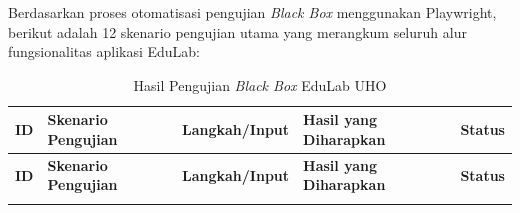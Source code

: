 \documentclass[12pt,a4paper,twoside]{report}
\begin{document}
Berdasarkan proses otomatisasi pengujian \textit{Black Box} menggunakan Playwright, berikut adalah 12 skenario pengujian utama yang merangkum seluruh alur fungsionalitas aplikasi EduLab:

\begin{longtable}{|c|p{3.5cm}|p{4cm}|p{4cm}|c|}
\caption{Hasil Pengujian \textit{Black Box} EduLab UHO} \label{tab:hasil_pengujian} \\
\hline
\textbf{ID} & \textbf{Skenario Pengujian} & \textbf{Langkah/Input} & \textbf{Hasil yang Diharapkan} & \textbf{Status} \\
\hline
\endfirsthead
\hline
\textbf{ID} & \textbf{Skenario Pengujian} & \textbf{Langkah/Input} & \textbf{Hasil yang Diharapkan} & \textbf{Status} \\
\hline
\endhead
\hline
\endfoot
\hline
\endlastfoot


\end{longtable}
\end{document}
